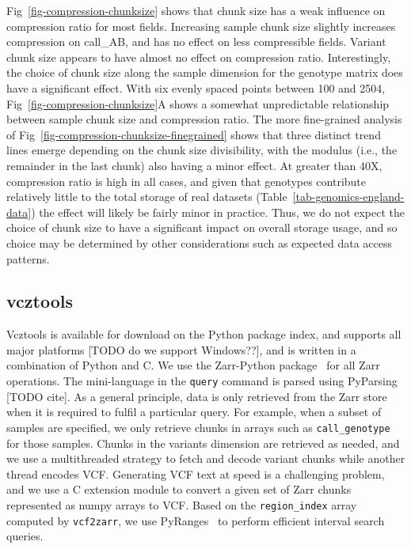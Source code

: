 \documentclass[a4paper,num-refs]{oup-contemporary}
\begin{document}
Fig~\ref{fig-compression-chunksize} shows that chunk size has a
weak influence on compression ratio for most fields.
Increasing sample chunk size slightly increases
compression on call\_AB, and has no effect on less compressible
fields. Variant chunk size appears to have almost no effect
on compression ratio.
Interestingly, the choice of chunk size along the sample dimension for the
genotype matrix does have a significant effect.
With six evenly spaced points between 100 and 2504,
Fig~\ref{fig-compression-chunksize}A shows a somewhat unpredictable
relationship between sample chunk size and compression ratio.
The more fine-grained analysis of
Fig~\ref{fig-compression-chunksize-finegrained} shows that three
distinct trend lines emerge depending on the chunk size
divisibility, with the modulus
(i.e., the remainder in the last chunk) also having a minor effect.
At greater than 40X,
compression ratio is
high in all cases, and given that genotypes contribute relatively
little to the total storage of real datasets
(Table~\ref{tab-genomics-england-data}) the effect will
likely be fairly minor in practice.
Thus, we do not expect the choice of chunk size to have a significant
impact on overall storage usage, and so choice may be
determined by other considerations such as expected data
access patterns.

\subsection{vcztools}
Vcztools is available for download on the Python package index, and
supports all major platforms [TODO do we support Windows??],
and is written in a combination of Python and C.
We use
the Zarr-Python package~\citep{zarrpython} for all Zarr operations.
The mini-language in the \texttt{query} command is parsed using
PyParsing [TODO cite].
As a general principle, data is only retrieved from the Zarr store
when it is required to fulfil a particular query. For example,
when a subset of samples are specified, we only retrieve chunks
in arrays such as \texttt{call\_genotype} for those
samples. Chunks in the variants dimension are retrieved as needed,
and we use a multithreaded strategy to fetch and decode variant chunks
while another thread encodes VCF. Generating VCF text at speed
is a challenging problem, and we use a C extension module to convert
a given set of Zarr chunks represented as numpy arrays to VCF.
Based on the \texttt{region\_index} array computed by \texttt{vcf2zarr},
we use PyRanges~\citep{stovner2020pyranges} to perform efficient interval
search queries.
\end{document}
